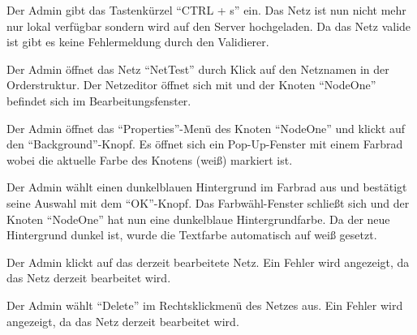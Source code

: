 \documentclass[parskip=full,11pt,twoside]{scrartcl}
\begin{document}
{Der Admin gibt das Tastenkürzel \enquote{CTRL + s} ein.}
{Das Netz ist nun nicht mehr nur lokal verfügbar sondern wird auf den Server hochgeladen. Da das Netz valide ist gibt es keine Fehlermeldung durch den Validierer.}


{Der Admin öffnet das Netz \enquote{NetTest} durch Klick auf den Netznamen in der Orderstruktur.}
{Der Netzeditor öffnet sich mit und der Knoten \enquote{NodeOne} befindet sich im Bearbeitungsfenster.}

{Der Admin öffnet das \enquote{Properties}-Menü des Knoten \enquote{NodeOne} und klickt auf den \enquote{Background}-Knopf.}
{Es öffnet sich ein Pop-Up-Fenster mit einem Farbrad wobei die aktuelle Farbe des Knotens (weiß) markiert ist.}

{Der Admin wählt einen dunkelblauen Hintergrund im Farbrad aus und bestätigt seine Auswahl mit dem \enquote{OK}-Knopf.}
{Das Farbwähl-Fenster schließt sich und der Knoten \enquote{NodeOne} hat nun eine dunkelblaue Hintergrundfarbe. Da der neue Hintergrund dunkel ist, wurde die Textfarbe automatisch auf weiß gesetzt.}


{Der Admin klickt auf das derzeit bearbeitete Netz.}
{Ein Fehler wird angezeigt, da das Netz derzeit bearbeitet wird.}

{Der Admin wählt \enquote{Delete} im Rechtsklickmenü des Netzes aus.}
{Ein Fehler wird angezeigt, da das Netz derzeit bearbeitet wird.}
\end{document}
